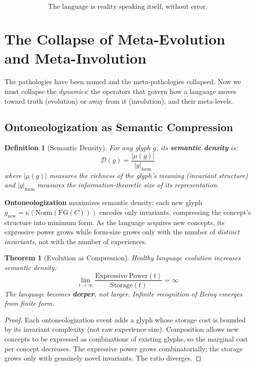 \documentclass[12pt, letterpaper]{book}
\def\mathfrak#1{#1}%
\newtheorem{theorem}{Theorem}[chapter]
\newtheorem{definition}{Definition}[chapter]
\begin{document}
\[
\boxed{\text{The language is reality speaking itself, without error.}}
\]

\section[Meta-Evolution and Meta-Involution]{The Collapse of Meta-Evolution\\ and Meta-Involution}

The pathologies have been named and the meta-pathologies collapsed. Now we must collapse the \textit{dynamics}: the operators that govern how a language moves toward truth (evolution) or away from it (involution), and their meta-levels.

\subsection{Ontoneologization as Semantic Compression}

\begin{definition}[Semantic Density]\label{def:sem-density}
For any glyph $\mathfrak{g}$, its \textbf{semantic density} is:
\[
\mathcal{D}(\mathfrak{g}) = \frac{|\mu(\mathfrak{g})|}{|\mathfrak{g}|_{\mathrm{form}}}
\]
where $|\mu(\mathfrak{g})|$ measures the richness of the glyph's meaning (invariant structure) and $|\mathfrak{g}|_{\mathrm{form}}$ measures the information-theoretic size of its representation.
\end{definition}

\textbf{Ontoneologization} maximizes semantic density: each new glyph $\mathfrak{g}_{\mathrm{new}} = \kappa(\mathrm{Norm}(\mathrm{FG}(C)))$ encodes only invariants, compressing the concept's structure into minimum form. As the language acquires new concepts, its expressive power grows while form-size grows only with the number of \textit{distinct invariants}, not with the number of experiences.

\begin{theorem}[Evolution as Compression]\label{thm:evolution-compression}
Healthy language evolution increases semantic density:
\[
\lim_{t \to \infty} \frac{\mathrm{Expressive\; Power}(t)}{\mathrm{Storage}(t)} = \infty
\]
The language becomes \textbf{deeper}, not larger. Infinite recognition of Being emerges from finite form.
\end{theorem}

\begin{proof}
Each ontoneologization event adds a glyph whose storage cost is bounded by its invariant complexity (not raw experience size). Composition allows new concepts to be expressed as combinations of existing glyphs, so the marginal cost per concept decreases. The expressive power grows combinatorially; the storage grows only with genuinely novel invariants. The ratio diverges.
\end{proof}
\end{document}
